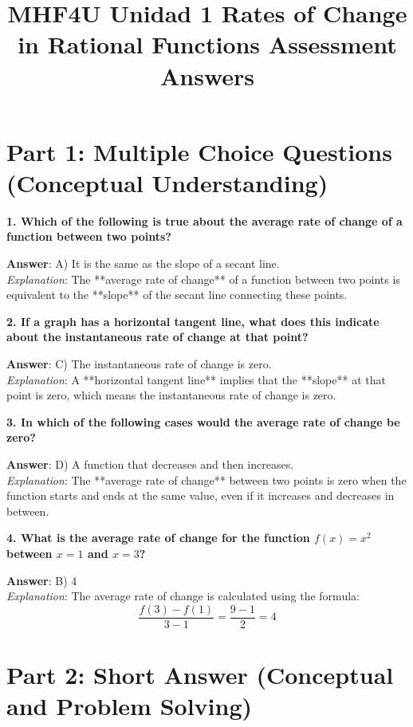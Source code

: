 \documentclass{article}
\title{MHF4U Unidad 1 Rates of Change in Rational Functions Assessment Answers}
\author{}
\date{}
\begin{document}
\maketitle

\section*{Part 1: Multiple Choice Questions (Conceptual Understanding)}

\textbf{1. Which of the following is true about the average rate of change of a function between two points?}

\textbf{Answer}: A) It is the same as the slope of a secant line. \\
\textit{Explanation}: The **average rate of change** of a function between two points is equivalent to the **slope** of the secant line connecting these points.

\bigskip

\textbf{2. If a graph has a horizontal tangent line, what does this indicate about the instantaneous rate of change at that point?}

\textbf{Answer}: C) The instantaneous rate of change is zero. \\
\textit{Explanation}: A **horizontal tangent line** implies that the **slope** at that point is zero, which means the instantaneous rate of change is zero.

\bigskip

\textbf{3. In which of the following cases would the average rate of change be zero?}

\textbf{Answer}: D) A function that decreases and then increases. \\
\textit{Explanation}: The **average rate of change** between two points is zero when the function starts and ends at the same value, even if it increases and decreases in between.

\bigskip

\textbf{4. What is the average rate of change for the function \( f(x) = x^2 \) between \( x = 1 \) and \( x = 3 \)?}

\textbf{Answer}: B) 4 \\
\textit{Explanation}: The average rate of change is calculated using the formula:
\[
\frac{f(3) - f(1)}{3 - 1} = \frac{9 - 1}{2} = 4
\]

\newpage

\section*{Part 2: Short Answer (Conceptual and Problem Solving)}
\end{document}
